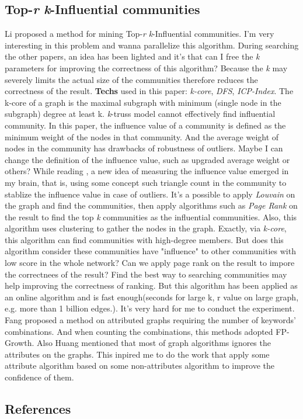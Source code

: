 \documentclass{article}
\begin{document}
	\subsection{Top-\emph{r} \emph{k}-Influential communities}
	Li\cite{li2015influential} proposed a method for mining Top-\emph{r} \emph{k}-Influential communities. I'm very interesting in this problem and wanna parallelize this algorithm. During searching the other papers, an idea has been lighted and it's that can I free the \emph{k} parameters for improving the correctness of this algorithm? Because the \emph{k} may severely limits the actual size of the communities therefore reduces the correctness of the result.
	\newline
	\textbf{Techs} used in this paper: \emph{k-core}, \emph{DFS}, \emph{ICP-Index}.
	\newline
	The k-core of a graph is the maximal subgraph with minimum (single node in the subgraph) degree at least k. \emph{k}-truss model cannot effectively find influential community.
	\newline
	In this paper, the influence value of a community is defined as the minimum weight of the nodes in that community. And the average weight of nodes in the community has drawbacks of robustness of outliers. Maybe I can change the definition of the influence value, such as upgraded average weight or others? While reading \cite{huang2015approximate}, a new idea of measuring the influence value emerged in my brain, that is, using some concept such triangle count in the community to stablize the influence value in case of outliers.
	\newline
	It's a possible to apply \emph{Louvain} on the graph and find the communities, then apply algorithms such as \emph{Page Rank} on the result to find the top \emph{k} communities as the influential communities. Also, this algorithm uses clustering to gather the nodes in the graph. Exactly, via \emph{k-core}, this algorithm can find communities with high-degree members. But does this algorithm consider these communities have "influence" to other communities with low score in the whole network? Can we apply page rank on the result to impore the correctnees of the result?
	\newline
	Find the best way to searching communities may help improving the correctness of ranking.
	\newline
	But this algorithm has been applied as an online algorithm and is fast enough(seconds for large k, r value on large graph, e.g. more than 1 billion edges.). It's very hard for me to conduct the experiment.
	\newline
	Fang\cite{fang2016effective} proposed a method on attributed graphs requiring the number of keywords' combinations. And when counting the combinations, this methods adopted FP-Growth\cite{han2002fp}.
	\newline
	Also Huang\cite{huang2016attribute} mentioned that most of graph algorithms ignores the attributes on the graphs. This inpired me to do the work that apply some attribute algorithm based on some non-attributes algorithm to improve the confidence of them.

	\begin{appendix}
		\section{References}
		
		
	\end{appendix}
\end{document}
